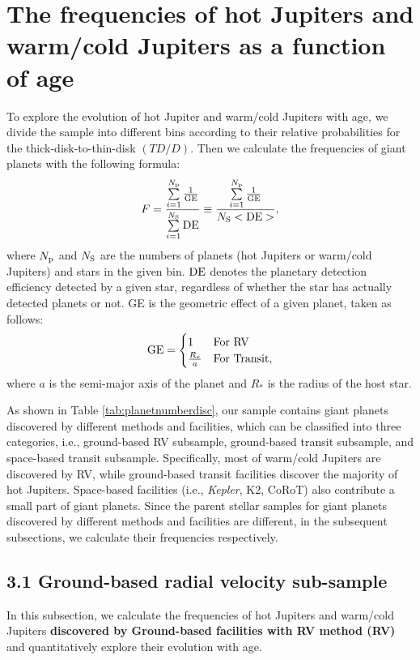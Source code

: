 \documentclass[twocolumn]{pnas-new}
\begin{document}
\section{The frequencies of hot Jupiters and warm/cold Jupiters as a function of age} 
\label{sec.obs.evolution}
To explore the evolution of hot Jupiter and warm/cold Jupiters with age, we divide the sample into different bins according to their relative probabilities for the thick-disk-to-thin-disk $(TD/D)$. 
Then we calculate the frequencies of giant planets with the following formula:
\begin{equation}
  F = \frac{\sum\limits_{i=1}^{N_{\rm p}}{\frac{1}{\rm GE}}}{\sum\limits_{i=1}^{N_{\rm S}}  {\rm DE}} \equiv \frac{\sum\limits_{i=1}^{N_{\rm p}}{\frac{1}{\rm GE}}}{N_{\rm S} <\rm DE>},
\end{equation}
where $N_{\rm p}$ and $N_{\rm S}$ are the numbers of planets (hot Jupiters or warm/cold Jupiters) and stars in the given bin.
$\rm DE$ denotes the planetary detection efficiency detected by a given star, regardless of
whether the star has actually detected planets or not.
GE is the geometric effect of a given planet, taken as follows:
\begin{eqnarray}
{\rm GE}= \begin{cases} {1}&\mbox{For RV}\\ \frac{R_*}{a}&\mbox{For Transit}, \end{cases}
\end{eqnarray}
where $a$ is the semi-major axis of the planet and $R_*$ is the radius of the host star.
   
As shown in Table \ref{tab:planetnumberdisc}, our sample contains giant planets discovered by different methods and facilities, which can be classified into three categories, i.e., ground-based RV subsample, ground-based transit subsample, and space-based transit subsample. Specifically, most of warm/cold Jupiters are discovered by RV, while ground-based transit facilities discover the majority of hot Jupiters. 
Space-based facilities (i.e., {\it Kepler}, K2, CoRoT) also contribute a small part of giant planets. 
Since the parent stellar samples for giant planets discovered by different methods and facilities are different, in the subsequent subsections, we calculate their frequencies respectively.

\subsection*{3.1 Ground-based radial velocity sub-sample}
\label{sec.obs.RV}
In this subsection, we calculate the frequencies of hot Jupiters and warm/cold Jupiters \textbf{discovered by Ground-based facilities with RV method (RV)} and quantitatively explore their evolution with age.
\end{document}
